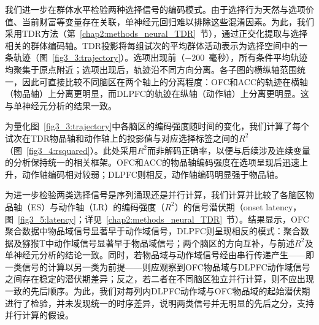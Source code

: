 我们进一步在群体水平检验两种选择信号的编码模式。由于选择行为天然与选项价值、当前财富等变量存在关联，单神经元回归难以排除这些混淆因素。为此，我们采用TDR方法（第~\ref{chap2:methods_neural_TDR}~节），通过正交化提取与选择相关的群体编码轴。TDR投影将每组试次的平均群体活动表示为选择空间中的一条轨迹（图~\ref{fig3_3:trajectory}）。选项出现前（$-200$~毫秒），所有条件平均轨迹均聚集于原点附近；选项出现后，轨迹沿不同方向分离。各子图的横纵轴范围统一，因此可直接比较不同脑区在两个轴上的分离程度：OFC和ACC的轨迹在横轴（物品轴）上分离更明显，而DLPFC的轨迹在纵轴（动作轴）上分离更明显。这与单神经元分析的结果一致。

为量化图~\ref{fig3_3:trajectory}中各脑区的编码强度随时间的变化，我们计算了每个试次在TDR物品轴和动作轴上的投影值与对应选择标签之间的$R^2$（图~\ref{fig3_4:rsquared}）。此处采用$R^2$而非解码正确率，以便与后续涉及连续变量的分析保持统一的相关框架。OFC和ACC的物品轴编码强度在选项呈现后迅速上升，动作轴编码相对较弱；DLPFC则相反，动作轴编码明显强于物品轴。

为进一步检验两类选择信号是序列涌现还是并行计算，我们计算并比较了各脑区物品轴（ES）与动作轴（LR）的编码强度（$R^2$）的信号潜伏期（onset latency，图~\ref{fig3_5:latency}；详见~\ref{chap2:methods_neural_TDR}~节）。结果显示，OFC聚合数据中物品域信号显著早于动作域信号，DLPFC则呈现相反的模式：聚合数据及猕猴T中动作域信号显著早于物品域信号；两个脑区的方向互补，与前述$R^2$及单神经元分析的结论一致。同时，若物品域与动作域信号经由串行传递产生——即一类信号的计算以另一类为前提——则应观察到OFC物品域与DLPFC动作域信号之间存在稳定的潜伏期差异；反之，若二者在不同脑区独立并行计算，则不应出现一致的先后顺序。为此，我们对每列内DLPFC动作域与OFC物品域的起始潜伏期进行了检验，并未发现统一的时序差异，说明两类信号并无明显的先后之分，支持并行计算的假设。

